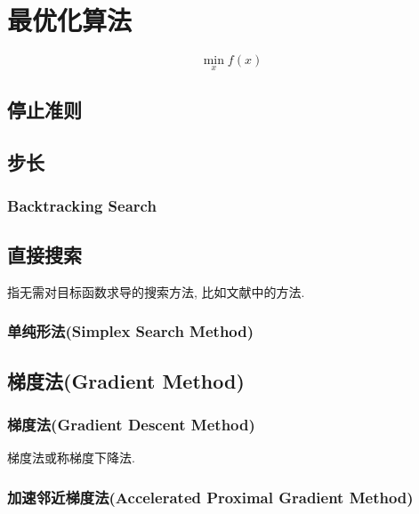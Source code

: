 \chapter{最优化算法}

\begin{problem}[无约束极小化]
	\begin{equation}
		\min_x f(x) 
	\end{equation}
\end{problem}

\section{停止准则}

\section{步长}

\subsection{Backtracking Search}



\section{直接搜索}
指无需对目标函数求导的搜索方法, 比如文献\cite{schutze2011directed}中的方法.

\subsection{单纯形法(Simplex Search Method)}


\section{梯度法(Gradient Method)}

\subsection{梯度法(Gradient Descent Method)}

梯度法或称梯度下降法.



\subsection{加速邻近梯度法(Accelerated Proximal Gradient Method)}

